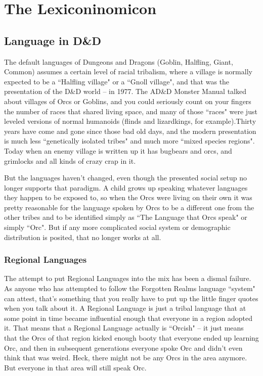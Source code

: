 \chapter{The Lexiconinomicon} %

\section{Language in D\&D}
\vspace*{-8pt}

The default languages of Dungeons and Dragons (Goblin, Halfling, Giant, Common) assumes a certain level of racial tribalism, where a village is normally expected to be a ``Halfling village" or a ``Gnoll village", and that was the presentation of the D\&D world -- in 1977. The AD\&D Monster Manual talked about villages of Orcs or Goblins, and you could seriously count on your fingers the number of races that shared living space, and many of those ``races" were just leveled versions of normal humanoids (flinds and lizardkings, for example).Thirty years have come and gone since those bad old days, and the modern presentation is much less ``genetically isolated tribes" and much more ``mixed species regions". Today when an enemy village is written up it has bugbears and orcs, and grimlocks and all kinds of crazy crap in it.

But the languages haven't changed, even though the presented social setup no longer supports that paradigm. A child grows up speaking whatever languages they happen to be exposed to, so when the Orcs were living on their own it was pretty reasonable for the language spoken by Orcs to be a different one from the other tribes and to be identified simply as ``The Language that Orcs speak" or simply ``Orc". But if any more complicated social system or demographic distribution is posited, that no longer works at all.

\subsection{Regional Languages}

The attempt to put Regional Languages into the mix has been a dismal failure. As anyone who has attempted to follow the Forgotten Realms language ``system" can attest, that's something that you really have to put up the little finger quotes when you talk about it. A Regional Language is just a tribal language that at some point in time became influential enough that everyone in a region adopted it. That means that a Regional Language actually is ``Orcish" -- it just means that the Orcs of that region kicked enough booty that everyone ended up learning Orc, and then in subsequent generations everyone spoke Orc and didn't even think that was weird. Heck, there might not be any Orcs in the area anymore. But everyone in that area will still speak Orc.

